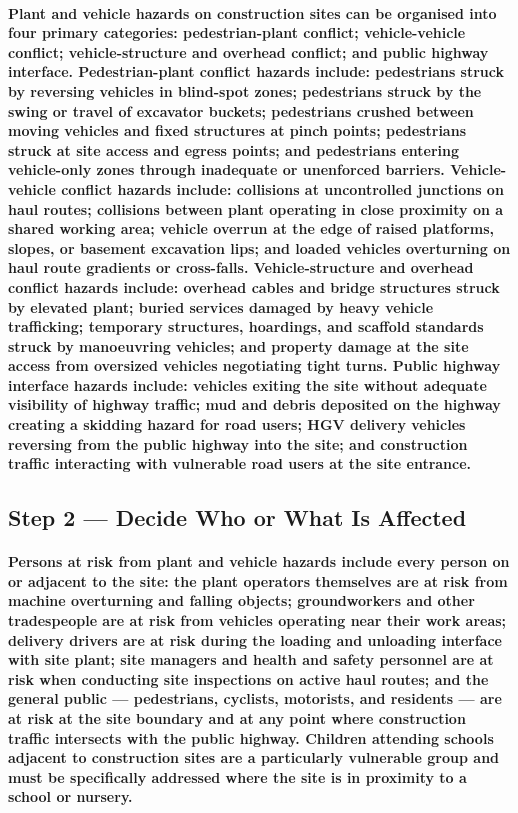 \paragraph{Plant and vehicle hazards on construction sites can be organised into four primary categories: pedestrian-plant conflict; vehicle-vehicle conflict; vehicle-structure and overhead conflict; and public highway interface. Pedestrian-plant conflict hazards include: pedestrians struck by reversing vehicles in blind-spot zones; pedestrians struck by the swing or travel of excavator buckets; pedestrians crushed between moving vehicles and fixed structures at pinch points; pedestrians struck at site access and egress points; and pedestrians entering vehicle-only zones through inadequate or unenforced barriers. Vehicle-vehicle conflict hazards include: collisions at uncontrolled junctions on haul routes; collisions between plant operating in close proximity on a shared working area; vehicle overrun at the edge of raised platforms, slopes, or basement excavation lips; and loaded vehicles overturning on haul route gradients or cross-falls. Vehicle-structure and overhead conflict hazards include: overhead cables and bridge structures struck by elevated plant; buried services damaged by heavy vehicle trafficking; temporary structures, hoardings, and scaffold standards struck by manoeuvring vehicles; and property damage at the site access from oversized vehicles negotiating tight turns. Public highway interface hazards include: vehicles exiting the site without adequate visibility of highway traffic; mud and debris deposited on the highway creating a skidding hazard for road users; HGV delivery vehicles reversing from the public highway into the site; and construction traffic interacting with vulnerable road users at the site entrance.}

\subsection{Step 2 --- Decide Who or What Is Affected}
\paragraph{Persons at risk from plant and vehicle hazards include every person on or adjacent to the site: the plant operators themselves are at risk from machine overturning and falling objects; groundworkers and other tradespeople are at risk from vehicles operating near their work areas; delivery drivers are at risk during the loading and unloading interface with site plant; site managers and health and safety personnel are at risk when conducting site inspections on active haul routes; and the general public --- pedestrians, cyclists, motorists, and residents --- are at risk at the site boundary and at any point where construction traffic intersects with the public highway. Children attending schools adjacent to construction sites are a particularly vulnerable group and must be specifically addressed where the site is in proximity to a school or nursery.}

